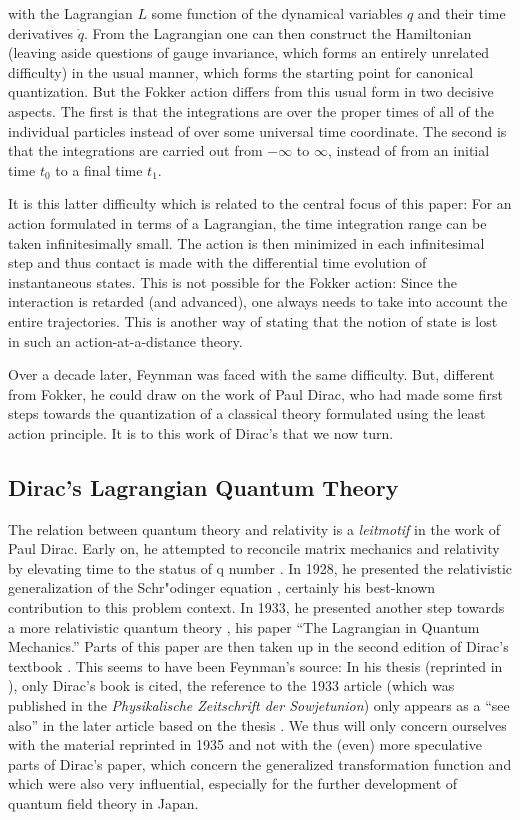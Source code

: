 \documentclass[12pt,a4paper]{article}
\begin{document}
with the Lagrangian $L$ some function of the dynamical variables $q$ and their time derivatives $\dot{q}$. From the Lagrangian one can then construct the Hamiltonian (leaving aside questions of gauge invariance, which forms an entirely unrelated difficulty) in the usual manner, which forms the starting point for canonical quantization. But the Fokker action differs from this usual form in two decisive aspects. The first is that the integrations are over the proper times of all of the individual particles instead of over some universal time coordinate. The second is that the integrations are carried out from $-\infty$ to $\infty$, instead of from an initial time $t_0$ to a final time $t_1$.

It is this latter difficulty which is related to the central focus of this paper: For an action formulated in terms of a Lagrangian, the time integration range can be taken infinitesimally small. The action is then minimized in each infinitesimal step and thus contact is made with the differential time evolution of instantaneous states. This is not possible for the Fokker action: Since the interaction is retarded (and advanced), one always needs to take into account the entire trajectories. This is another way of stating that the notion of state is lost in such an action-at-a-distance theory. 

Over a decade later, Feynman was faced with the same difficulty. But, different from Fokker, he could draw on the work of Paul Dirac, who had made some first steps towards the quantization of a classical theory formulated using the least action principle. It is to this work of Dirac's that we now turn.

\subsection{Dirac's Lagrangian Quantum Theory}

The relation between quantum theory and relativity is a \emph{leitmotif} in the work of Paul Dirac. Early on, he attempted to reconcile matrix mechanics and relativity by elevating time to the status of q number \citep{dirac_1926_relativity}. In 1928, he presented the relativistic generalization of the Schr"odinger equation \citep{dirac_1928_the-quantum1}, certainly his best-known contribution to this problem context. In 1933, he presented another step towards a more relativistic quantum theory \citep{dirac_1933_the-lagrangian}, his paper ``The Lagrangian in Quantum Mechanics.'' Parts of this paper are then taken up in the second edition of Dirac's textbook \citep{dirac_1935_the-principles}. This seems to have been Feynman's source: In his thesis (reprinted in \citep{brown_2005_feynmans}), only Dirac's book is cited, the reference to the 1933 article (which was published in the \emph{Physikalische Zeitschrift der Sowjetunion}) only appears as a ``see also'' in the later article based on the thesis \citep{feynman_1948_space-time}. We thus will only concern ourselves with the material reprinted in 1935 and not with the (even) more speculative parts of Dirac's paper, which concern the generalized transformation function and which were also very influential, especially for the further development of quantum field theory in Japan.
\end{document}
